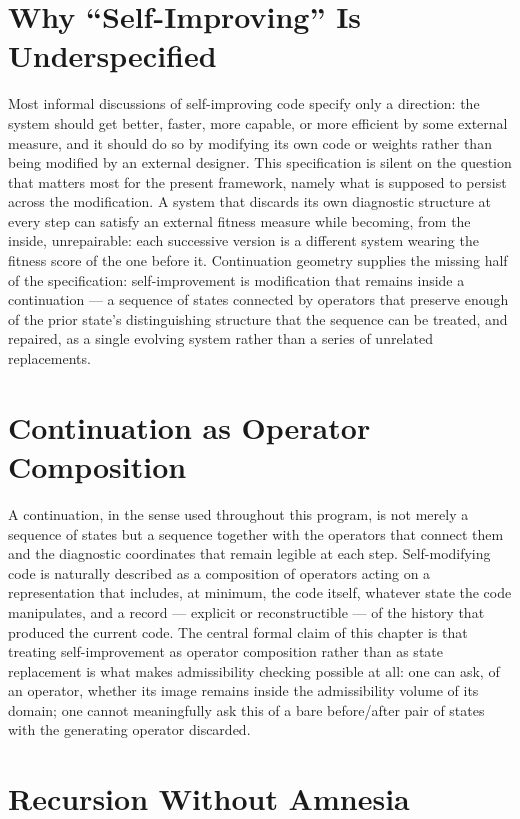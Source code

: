 \documentclass[11pt]{book}
\begin{document}
\section{Why ``Self-Improving'' Is Underspecified}

Most informal discussions of self-improving code specify only a direction: the system should get better, faster, more capable, or more efficient by some external measure, and it should do so by modifying its own code or weights rather than being modified by an external designer. This specification is silent on the question that matters most for the present framework, namely what is supposed to persist across the modification. A system that discards its own diagnostic structure at every step can satisfy an external fitness measure while becoming, from the inside, unrepairable: each successive version is a different system wearing the fitness score of the one before it. Continuation geometry supplies the missing half of the specification: self-improvement is modification that remains inside a continuation --- a sequence of states connected by operators that preserve enough of the prior state's distinguishing structure that the sequence can be treated, and repaired, as a single evolving system rather than a series of unrelated replacements.

\section{Continuation as Operator Composition}

A continuation, in the sense used throughout this program, is not merely a sequence of states but a sequence together with the operators that connect them and the diagnostic coordinates that remain legible at each step. Self-modifying code is naturally described as a composition of operators acting on a representation that includes, at minimum, the code itself, whatever state the code manipulates, and a record --- explicit or reconstructible --- of the history that produced the current code. The central formal claim of this chapter is that treating self-improvement as operator composition rather than as state replacement is what makes admissibility checking possible at all: one can ask, of an operator, whether its image remains inside the admissibility volume of its domain; one cannot meaningfully ask this of a bare before/after pair of states with the generating operator discarded.

\section{Recursion Without Amnesia}
\end{document}
